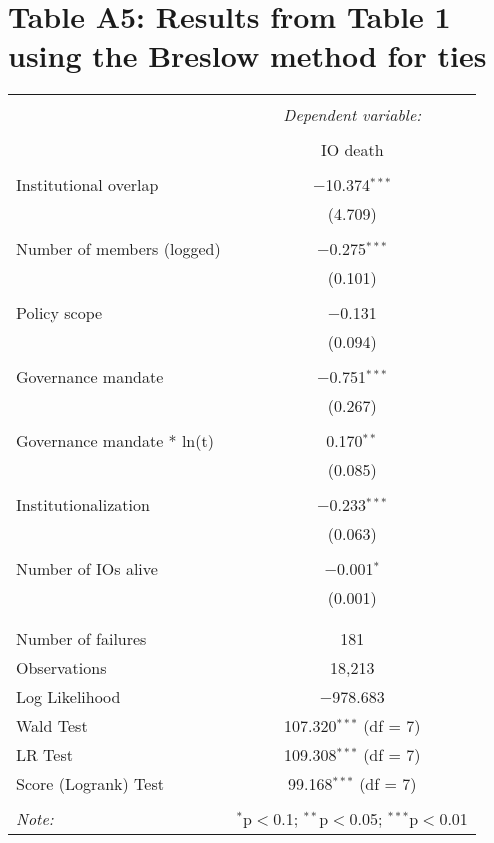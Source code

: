 \documentclass[12pt]{article}
\begin{document}
\newpage

\section*{Table A5: Results from Table 1 using the Breslow method for ties}

\begin{table}[H] \centering 
\footnotesize
\begin{tabular}{@{\extracolsep{5pt}}lc} 
\\[-1.8ex]\hline 
\hline \\[-1.8ex] 
 & \multicolumn{1}{c}{\textit{Dependent variable:}} \\ 
\cline{2-2} 
\\[-1.8ex] & IO death \\ 
\hline \\[-1.8ex] 
 Institutional overlap & $-$10.374$^{***}$ \\ 
  & (4.709) \\ 
  & \\ 
 Number of members (logged) & $-$0.275$^{***}$ \\ 
  & (0.101) \\ 
  & \\ 
 Policy scope & $-$0.131 \\ 
  & (0.094) \\ 
  & \\ 
 Governance mandate & $-$0.751$^{***}$ \\ 
  & (0.267) \\ 
  & \\ 
 Governance mandate * ln(t) & 0.170$^{**}$ \\ 
  & (0.085) \\ 
  & \\ 
 Institutionalization & $-$0.233$^{***}$ \\ 
  & (0.063) \\ 
  & \\ 
 Number of IOs alive & $-$0.001$^{*}$ \\ 
  & (0.001) \\ 
  & \\ 
\hline \\[-1.8ex] 
Number of failures & 181 \\ 
Observations & 18,213 \\ 
Log Likelihood & $-$978.683 \\ 
Wald Test & 107.320$^{***}$ (df = 7) \\ 
LR Test & 109.308$^{***}$ (df = 7) \\ 
Score (Logrank) Test & 99.168$^{***}$ (df = 7) \\ 
\hline 
\hline \\[-1.8ex] 
\textit{Note:}  & \multicolumn{1}{r}{$^{*}$p$<$0.1; $^{**}$p$<$0.05; $^{***}$p$<$0.01} \\ 
\end{tabular} 
\end{table} 
\end{document}
